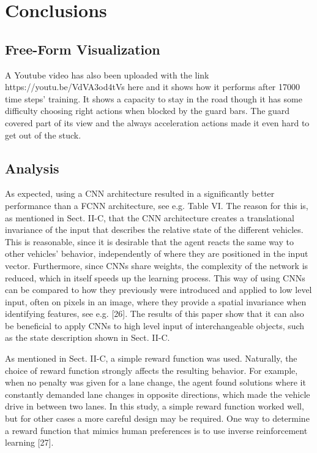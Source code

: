 \chapter{Conclusions}

\section{Free-Form Visualization}

A Youtube video has also been uploaded with the link https://youtu.be/VdVA3od4tVs here and it shows how it performs after 17000 time steps' training. It shows a capacity to stay in the road though it has some difficulty choosing right actions when blocked by the guard bars. The guard covered part of its view and the always acceleration actions made it even hard to get out of the stuck.

\section{Analysis}

As expected, using a CNN architecture resulted in a significantly better performance than a FCNN architecture, see e.g. Table VI. The reason for this is, as mentioned in Sect. II-C, that the CNN architecture creates a translational invariance of the input that describes the relative state of the different vehicles. This is reasonable, since it is desirable that the agent reacts the same way to other vehicles' behavior, independently of where they are positioned in the input vector. Furthermore, since CNNs share weights, the complexity of the network is reduced, which in itself speeds up the learning process. This way of using CNNs can be compared to how they previously were introduced and applied to low level input, often on pixels in an image, where they provide a spatial invariance when identifying features, see e.g. [26]. The results of this paper show that it can also be beneficial to apply CNNs to high level input of interchangeable objects, such as the state description shown in Sect. II-C.

As mentioned in Sect. II-C, a simple reward function was used. Naturally, the choice of reward function strongly affects the resulting behavior. For example, when no penalty was given for a lane change, the agent found solutions where it constantly demanded lane changes in opposite directions, which made the vehicle drive in between two lanes. In this study, a simple reward function worked well, but for other cases a more careful design may be required. One way to determine a reward function that mimics human preferences is to use inverse reinforcement learning [27].


